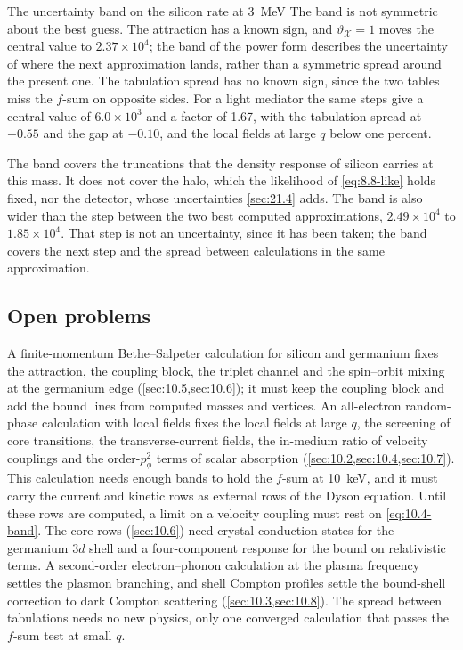 \begin{workedexample}{The uncertainty band on the silicon rate at \SI{3}{MeV}}
The band is not symmetric about the best guess. The attraction has a known sign, and $\vartheta_{\mathcal{X}} = 1$ moves the central value to $2.37\times10^4$; the band of the power form describes the uncertainty of where the next approximation lands, rather than a symmetric spread around the present one. The tabulation spread has no known sign, since the two tables miss the $f$-sum on opposite sides. For a light mediator the same steps give a central value of $6.0\times10^3$ and a factor of 1.67, with the tabulation spread at $+0.55$ and the gap at $-0.10$, and the local fields at large $q$ below one percent.

The band covers the truncations that the density response of silicon carries at this mass. It does not cover the halo, which the likelihood of \cref{eq:8.8-like} holds fixed, nor the detector, whose uncertainties \cref{sec:21.4} adds. The band is also wider than the step between the two best computed approximations, $2.49\times10^4$ to $1.85\times10^4$. That step is not an uncertainty, since it has been taken; the band covers the next step and the spread between calculations in the same approximation.
\end{workedexample}

\subsection{Open problems}\label{sec:10.10-open}

A finite-momentum Bethe--Salpeter calculation for silicon and germanium fixes the attraction, the coupling block, the triplet channel and the spin--orbit mixing at the germanium edge (\cref{sec:10.5,sec:10.6}); it must keep the coupling block and add the bound lines from computed masses and vertices. An all-electron random-phase calculation with local fields fixes the local fields at large $q$, the screening of core transitions, the transverse-current fields, the in-medium ratio of velocity couplings and the order-$p_\phi^2$ terms of scalar absorption (\cref{sec:10.2,sec:10.4,sec:10.7}). This calculation needs enough bands to hold the $f$-sum at \SI{10}{keV}, and it must carry the current and kinetic rows as external rows of the Dyson equation. Until these rows are computed, a limit on a velocity coupling must rest on \cref{eq:10.4-band}. The core rows (\cref{sec:10.6}) need crystal conduction states for the germanium $3d$ shell and a four-component response for the bound on relativistic terms. A second-order electron--phonon calculation at the plasma frequency settles the plasmon branching, and shell Compton profiles settle the bound-shell correction to dark Compton scattering (\cref{sec:10.3,sec:10.8}). The spread between tabulations needs no new physics, only one converged calculation that passes the $f$-sum test at small $q$.

